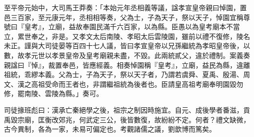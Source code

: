 \begin{pinyinscope}
至平帝元始中，大司馬王莽奏：「本始元年丞相義等議，諡孝宣皇帝親曰悼園，置邑三百家，至元康元年，丞相相等奏，父為士，子為天子，祭以天子，悼園宜稱尊號曰『皇考』，立廟，益故奉園民滿千六百家，以為縣。臣愚以為皇考廟本不當立，累世奉之，非是。又孝文太后南陵、孝昭太后雲陵園，雖前以禮不復修，陵名未正。謹與大司徒晏等百四十七人議，皆曰孝宣皇帝以兄孫繼統為孝昭皇帝後，以數，故孝元世以孝景皇帝及皇考廟親未盡，不毀。此兩統貳父，違於禮制。案義奏親諡曰『悼』，裁置奉邑，皆應經義。相奏悼園稱『皇考』，立廟，益民為縣，違離祖統，乖繆本義。父為士，子為天子，祭以天子者，乃謂若虞舜、夏禹、殷湯、周文、漢之高祖受命而王者也，非謂繼祖統為後者也。臣請皇高祖考廟奉明園毀勿修，罷南陵、雲陵為縣。」奏可。

司徒掾班彪曰：漢承亡秦絕學之後，祖宗之制因時施宜。自元、成後學者番滋，貢禹毀宗廟，匡衡改郊兆，何武定三公，後皆數復，故紛紛不定。何者？禮文缺微，古今異制，各為一家，未易可偏定也。考觀諸儒之議，劉歆博而篤矣。


\end{pinyinscope}